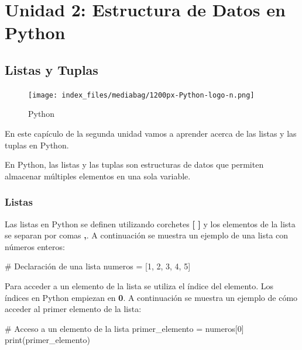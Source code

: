 \documentclass[
  a4paper,
  DIV=11,
  numbers=noendperiod,
  onepage,
  openany]{scrreprt}
\newenvironment{Shaded}{\begin{snugshade}}{\end{snugshade}}
\newcommand{\BuiltInTok}[1]{\textcolor[rgb]{0.00,0.23,0.31}{#1}}
\newcommand{\CommentTok}[1]{\textcolor[rgb]{0.37,0.37,0.37}{#1}}
\newcommand{\DecValTok}[1]{\textcolor[rgb]{0.68,0.00,0.00}{#1}}
\newcommand{\NormalTok}[1]{\textcolor[rgb]{0.00,0.23,0.31}{#1}}
\newcommand{\OperatorTok}[1]{\textcolor[rgb]{0.37,0.37,0.37}{#1}}
\begin{document}
\part{Unidad 2: Estructura de Datos en Python}

\chapter{Listas y Tuplas}\label{listas-y-tuplas}

\begin{figure}[H]

{\centering \texttt{[image: index\_files/mediabag/1200px-Python-logo-n.png]}

}

\caption{Python}

\end{figure}%

En este capículo de la segunda unidad vamos a aprender acerca de las
listas y las tuplas en Python.

En Python, las listas y las tuplas son estructuras de datos que permiten
almacenar múltiples elementos en una sola variable.

\section{Listas}\label{listas}

Las listas en Python se definen utilizando corchetes \textbf{{[} {]}} y
los elementos de la lista se separan por comas \textbf{,}. A
continuación se muestra un ejemplo de una lista con números enteros:

\begin{Shaded}
\begin{Highlighting}[]
\CommentTok{\# Declaración de una lista}
\NormalTok{numeros }\OperatorTok{=}\NormalTok{ [}\DecValTok{1}\NormalTok{, }\DecValTok{2}\NormalTok{, }\DecValTok{3}\NormalTok{, }\DecValTok{4}\NormalTok{, }\DecValTok{5}\NormalTok{]}
\end{Highlighting}
\end{Shaded}

Para acceder a un elemento de la lista se utiliza el índice del
elemento. Los índices en Python empiezan en \textbf{0}. A continuación
se muestra un ejemplo de cómo acceder al primer elemento de la lista:

\begin{Shaded}
\begin{Highlighting}[]
\CommentTok{\# Acceso a un elemento de la lista}
\NormalTok{primer\_elemento }\OperatorTok{=}\NormalTok{ numeros[}\DecValTok{0}\NormalTok{]}
\BuiltInTok{print}\NormalTok{(primer\_elemento)}
\end{Highlighting}
\end{Shaded}
\end{document}

